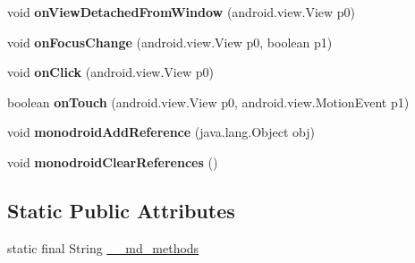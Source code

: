 \begin{DoxyCompactItemize}
void {\bfseries on\+View\+Detached\+From\+Window} (android.\+view.\+View p0)
\item 
\mbox{\label{classmd57018357d52b54713cd814fbd5262dd1f_1_1ButtonRenderer_ab3de4f03873d707b061b0aea023eb81c}} 
void {\bfseries on\+Focus\+Change} (android.\+view.\+View p0, boolean p1)
\item 
\mbox{\label{classmd57018357d52b54713cd814fbd5262dd1f_1_1ButtonRenderer_a9951a44f33f5bdeb1216dbc5f8be12be}} 
void {\bfseries on\+Click} (android.\+view.\+View p0)
\item 
\mbox{\label{classmd57018357d52b54713cd814fbd5262dd1f_1_1ButtonRenderer_a0c1824c75b7d6feae196c43f64997685}} 
boolean {\bfseries on\+Touch} (android.\+view.\+View p0, android.\+view.\+Motion\+Event p1)
\item 
\mbox{\label{classmd57018357d52b54713cd814fbd5262dd1f_1_1ButtonRenderer_a1901dfa607086d1752758dedb7ebb877}} 
void {\bfseries monodroid\+Add\+Reference} (java.\+lang.\+Object obj)
\item 
\mbox{\label{classmd57018357d52b54713cd814fbd5262dd1f_1_1ButtonRenderer_a82a2afe9fa4940b1718a61bfce8ee0df}} 
void {\bfseries monodroid\+Clear\+References} ()
\end{DoxyCompactItemize}
\subsection*{Static Public Attributes}
\begin{DoxyCompactItemize}
\item 
static final String \hyperlink{classmd57018357d52b54713cd814fbd5262dd1f_1_1ButtonRenderer_a07d67ace7550d930955ba79206673c60}{\+\_\+\+\_\+md\+\_\+methods}
\end{DoxyCompactItemize}
